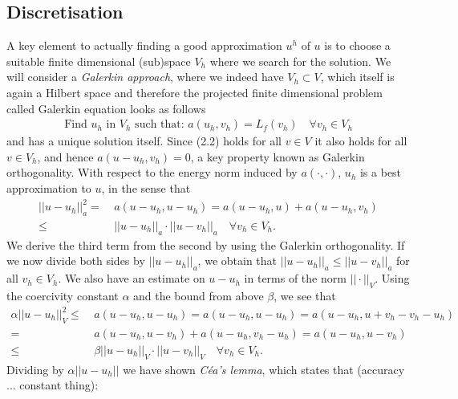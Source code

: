 \documentclass[../draft_1.tex]{subfiles}
\begin{document}
\subsection{Discretisation}
A key element to actually finding a good approximation $u^h$ of $u$ is to choose a suitable finite dimensional (sub)space $V_h$ where we search for the solution. We will consider a \textit{Galerkin approach}, where we indeed have $V_h \subset V$, which itself is again a Hilbert space and therefore the projected finite dimensional problem called Galerkin equation looks as follows
\begin{equation}
\begin{aligned}
\text{Find } u_h \text{ in } V_h \text{ such that:  } a(u_h, v_h) = L_f(v_h) \quad \forall v_h \in V_h
\end{aligned}
\end{equation}
and has a unique solution itself. Since (2.2) holds for all $v \in V$ it also holds for all $v \in V_h$, and hence $a(u-u_h, v_h) = 0$, a key property known as Galerkin orthogonality. With respect to the energy norm induced by $a(\cdot, \cdot)$, $u_h$ is a best approximation to $u$, in the sense that 
\begin{equation}
\begin{aligned}
|| u - u_h ||_a^2 =& \ a(u-u_h, u-u_h) = a(u-u_h, u) + a(u-u_h, v_h) \\
\leq& \ ||u - u_h ||_a \cdot || u - v_h ||_a \quad \forall v_h \in V_h.
\end{aligned}
\end{equation}
We derive the third term from the second by using the Galerkin orthogonality. If we now divide both sides by $|| u - u_h||_a$, we obtain that $|| u - u_h ||_a \leq || u -v_h||_a$ for all $v_h \in V_h$. We also have an estimate on $u - u_h$ in terms of the  norm $|| \cdot ||_V$. Using the coercivity constant $\alpha$ and the bound from above $\beta$, we see that
\begin{equation}
\begin{aligned}
\alpha || u - u_h ||_V^2 \leq& \ a(u-u_h, u-u_h) = a(u-u_h, u- u_h) = a(u-u_h, u +v_h - v_h - u_h ) \\
=& \ a(u-u_h, u - v_h) + a(u - u_h, v_h - u_h) = a(u-u_h, u - v_h) \\
\leq& \ \beta || u - u_h ||_V \cdot || u - v_h||_V  \quad \forall v_h \in V_h.
\end{aligned}
\end{equation}
Dividing by $\alpha || u - u_h || $ we have shown \textit{C\'{e}a's lemma}, which states that (accuracy ... constant thing):
\end{document}
